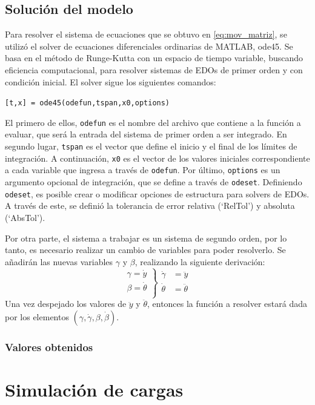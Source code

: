 \subsection{Solución del modelo}
Para resolver el sistema de ecuaciones que se obtuvo en \ref{eq:mov_matriz}, se utilizó el solver de ecuaciones diferenciales ordinarias de MATLAB, ode45. Se basa en el método de Runge-Kutta con un espacio de tiempo variable, buscando eficiencia computacional, para resolver sistemas de EDOs de primer orden y con condición inicial. El solver sigue los siguientes comandos:
\begin{center}
	\texttt{[t,x] = ode45(odefun,tspan,x0,options)}
\end{center}

El primero de ellos, \texttt{odefun} es el nombre del archivo que contiene a la función a evaluar, que será la entrada del sistema de primer orden a ser integrado. En segundo lugar, \texttt{tspan} es el vector que define el inicio y el final de los límites de integración. A continuación, \texttt{x0} es el vector de los valores iniciales correspondiente a cada variable que ingresa a través de \texttt{odefun}. Por último, \texttt{options} es un argumento opcional de integración, que se define a través de \texttt{odeset}. Definiendo \texttt{odeset}, es posible crear o modificar opciones de estructura para solvers de EDOs. A través de este, se definió la tolerancia de error relativa (`RelTol') y absoluta (`AbsTol').

Por otra parte, el sistema a trabajar es un sistema de segundo orden, por lo tanto, es necesario realizar un cambio de variables para poder resolverlo. Se añadirán las nuevas variables $\gamma$ y $\beta$, realizando la siguiente derivación:
\[ \left. 
\begin{array}{ll}
	\gamma = \dot{y}\\
	\beta = \dot{\theta}\\
\end{array}
\right\}
\begin{array}{ll}
	\dot{\gamma} &= \ddot{y}\\
	\dot{\theta} &= \ddot{\theta}\\
\end{array}\]
Una vez despejado los valores de $\ddot{y}$ y $\ddot{\theta}$, entonces la función a resolver estará dada por los elementos $(\gamma, \dot{\gamma}, \beta, \dot{\beta})$.  

\subsubsection{Valores obtenidos}

\section{Simulación de cargas}

